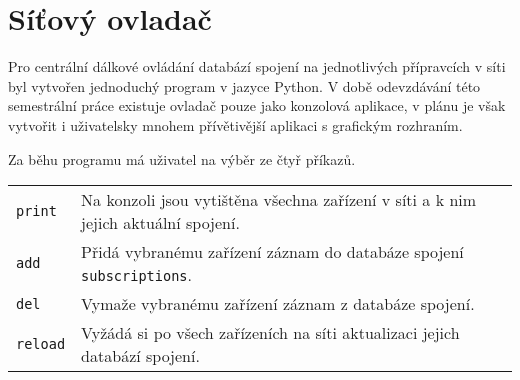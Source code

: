\chapter{Síťový ovladač}
Pro centrální dálkové ovládání databází spojení na jednotlivých přípravcích v síti byl vytvořen jednoduchý program v jazyce Python. V době odevzdávání této semestrální práce existuje ovladač pouze jako konzolová aplikace, v plánu je však vytvořit i uživatelsky mnohem přívětivější aplikaci s grafickým rozhraním.

\begin{figure}
    \caption{}
    \label{fig:Driver_1}
\end{figure}

Za běhu programu má uživatel na výběr ze čtyř příkazů.
\begin{table}[h]
    \centering
        \begin{tabular}{l p{}}
            \texttt{print} & Na konzoli jsou vytištěna všechna zařízení v síti a k nim jejich aktuální spojení. \\
            \texttt{add} & Přidá vybranému zařízení záznam do databáze spojení \texttt{subscriptions}. \\
            \texttt{del} & Vymaže vybranému zařízení záznam z databáze spojení. \\
            \texttt{reload} & Vyžádá si po všech zařízeních na síti aktualizaci jejich databází spojení. \\
        \end{tabular}
\end{table}

